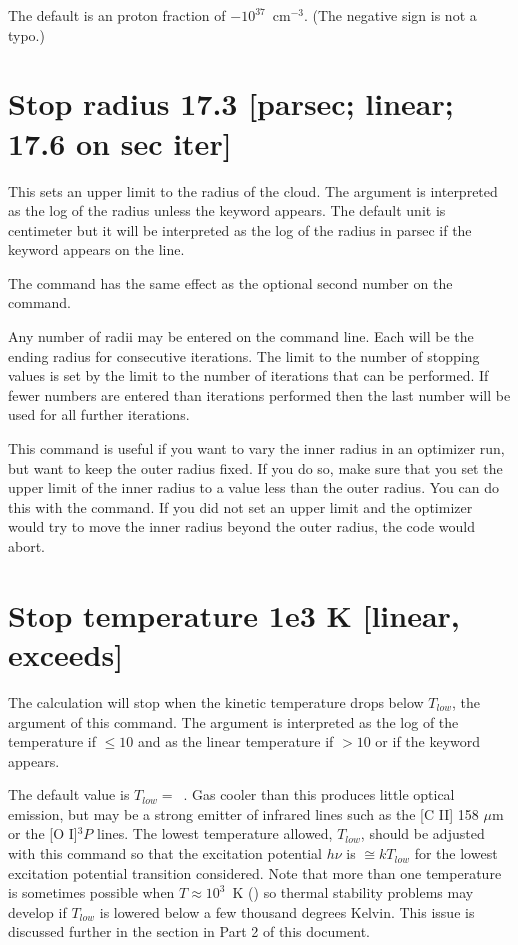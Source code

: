 The default is an proton fraction of $-10^{37}$~cm$^{-3}$.
(The negative sign is not a typo.)

\section{Stop radius 17.3 [parsec; linear; 17.6 on sec iter] }

This sets an upper limit to the radius of the cloud.
The argument
is interpreted as the log of the radius unless the keyword
 appears.
The default unit is centimeter but it will be interpreted
as the log
of the radius in parsec if the keyword 
appears on the line.

The  command has the same effect
as the optional second
number on the  command.

Any number of radii may be entered on the command line.
Each will
be the ending radius for consecutive iterations.
The limit to the number
of stopping values is set by the limit to the number of iterations that
can be performed.
If fewer numbers are entered than iterations performed
then the last number will be used for all further iterations.

This command is useful if you want to vary the inner radius in an optimizer
run, but want to keep the outer radius fixed. If you do so, make sure that you
set the upper limit of the inner radius to a value less than the outer radius.
You can do this with the  command. If you did not
set an upper limit and the optimizer would try to move the inner radius beyond
the outer radius, the code would abort.

\section{Stop temperature 1e3 K [linear, exceeds]}
\label{sec:CommandStopTemperature}

The calculation will stop when the kinetic temperature drops below
$T_{low}$, the argument of this command.
The argument is interpreted as the log of
the temperature if $\le 10$ and as the linear temperature
if $> 10$ or if the  keyword appears.

The default value is $T_{low} =$~\TEMPSTOPDEFAULT.
Gas cooler than this produces little
optical emission, but may be a strong emitter of infrared lines such as
the [C II] 158 $\mu$m or the [O I]$^3P$ lines.
The lowest temperature allowed,
$T_{low}$, should be adjusted with this command
so that the excitation potential
$h\nu$ is $\cong kT_{low}$ for the lowest excitation potential
transition considered.
Note that more than one temperature is sometimes possible
when $T \approx 10^3$~K
(\citealp{Williams1967}) so thermal stability problems may develop
if $T_{low}$ is lowered
below a few thousand degrees Kelvin.
This issue is discussed further in
the section  in Part 2 of this document.

